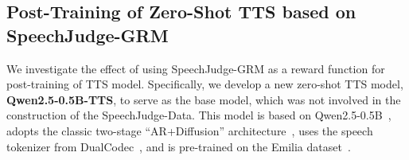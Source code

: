 \documentclass[]{bytedance_seed}
\begin{document}
\subsection{Post-Training of Zero-Shot TTS based on SpeechJudge-GRM}\label{sec:post-training-for-tts}

We investigate the effect of using SpeechJudge-GRM as a reward function for post-training of TTS model. Specifically, we develop a new zero-shot TTS model, \textbf{Qwen2.5-0.5B-TTS}, to serve as the base model, which was not involved in the construction of the SpeechJudge-Data. This model is based on Qwen2.5-0.5B~\citep{qwen2.5}, adopts the classic two-stage ``AR+Diffusion'' architecture~\citep{seedtts,cosyvoice}, uses the speech tokenizer from DualCodec~\citep{dualcodec}, and is pre-trained on the Emilia dataset~\citep{emilia-large}. 
\end{document}

